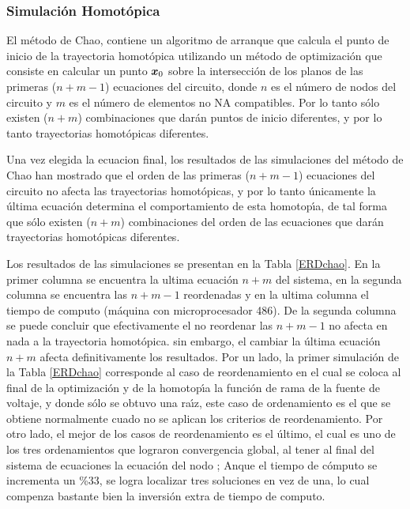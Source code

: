 \documentclass[conference,letterpaper,onecolumn]{IEEEtran}
\newcommand{\pig}[1]{\mbox{\boldmath ${#1}$}	}
\begin{document}
\subsubsection{Simulaci\'on Homot\'opica}

El m\'etodo de Chao, contiene un algoritmo de arranque que calcula el punto de inicio de la trayectoria homot\'opica utilizando  un m\'etodo de 
optimizaci\'on que consiste en calcular un punto $\pig{x}_0$ sobre
la intersecci\'on de los planos de las primeras ($n+m-1$) ecuaciones del
circuito, donde $n$ es el n\'umero de nodos del circuito y $m$ es el n\'umero
de elementos no NA com\-pa\-ti\-bles. Por lo tanto s\'olo existen ($n+m$) combinaciones
que dar\'an puntos de inicio diferentes, y por lo tanto trayectorias homot\'opicas
diferentes.


Una vez elegida la ecuacion final, los resultados de las simulaciones del m\'etodo de Chao han mostrado que el orden
de las primeras ($n+m-1$) ecuaciones del circuito no afecta las
trayectorias homot\'opicas, y por lo tanto \'unicamente la \'ultima
ecuaci\'on determina el comportamiento de esta homotop\'{\i}a, de tal
forma que s\'olo existen ($n+m$) combinaciones del orden de las
ecuaciones que dar\'an trayectorias homot\'opicas diferentes.

Los resultados de las simulaciones se presentan en la
Tabla \ref{ERDchao}. En la primer columna se encuentra la ultima ecuaci\'on $n+m$ del sistema, en la segunda columna
se encuentra las $n+m-1$ reordenadas y en la ultima columna el tiempo de computo (m\'aquina con microprocesador 486).
De la segunda columna se puede concluir que efectivamente el no reordenar las  $n+m-1$ no afecta en nada a la trayectoria homot\'opica.
sin embargo, el cambiar la \'ultima ecuaci\'on $n+m$  afecta definitivamente los resultados.
Por un lado, la primer simulaci\'on de la Tabla \ref{ERDchao} corresponde
al caso de reordenamiento en el cual se  coloca al final de la
optimizaci\'on y de la homotop\'{\i}a la funci\'on de rama de la fuente
de voltaje, y donde s\'olo se obtuvo una ra\'{\i}z, este caso de ordenamiento es el
que se obtiene normalmente cuado no se aplican los criterios de reordenamiento. 
Por otro lado, el mejor de los casos de reordenamiento es el \'ultimo, el
cual es uno de los tres ordenamientos que lograron convergencia global,
al tener al final del sistema de ecuaciones la ecuaci\'on del nodo
; Anque el tiempo de c\'omputo se incrementa un \%33, se logra localizar tres soluciones
en vez de una, lo cual compenza bastante bien la inversi\'on extra de tiempo de computo.
\end{document}
